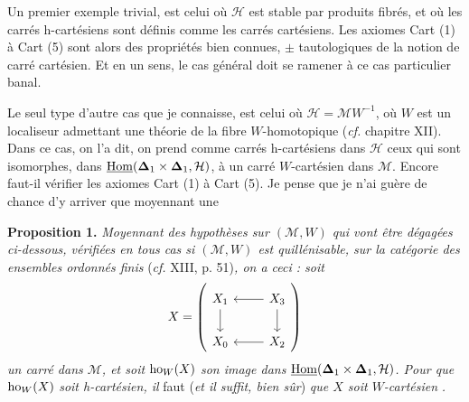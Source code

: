 Un premier exemple trivial, est celui où $\mathcal{H}$ est stable par produits fibrés, et où les carrés h-cartésiens sont définis comme les carrés cartésiens. Les axiomes Cart (1) à Cart (5) sont alors des propriétés bien connues, $\pm$ tautologiques de la notion de carré cartésien. Et
en un sens, le cas général doit se ramener à ce cas particulier banal.

Le seul type d'autre cas que je connaisse, est celui où $\mathcal{H} = \mathcal{M}W^{-1}$, où $W$ est un localiseur admettant une théorie de la fibre $W$-homotopique (\textit{cf.} chapitre XII). Dans ce cas, on l'a dit, on prend comme carrés h-cartésiens dans $\mathcal{H}$ ceux qui sont isomorphes, dans $\underline{\mathrm{Hom}}(\mathbf{\Delta}_1 \times \mathbf{\Delta}_1, \mathcal{H})$, à un carré $W$-cartésien dans $\mathcal{M}$. Encore faut-il vérifier les axiomes Cart (1) à Cart (5). Je pense que je n'ai guère de chance d'y arriver que moyennant une

\textbf{Proposition 1.} \textit{Moyennant des hypothèses sur $(\mathcal{M}, W)$ qui vont être dégagées ci-dessous, vérifiées en tous cas si $(\mathcal{M}, W)$ est quillénisable, sur la catégorie des ensembles ordonnés finis} (\textit{cf.} XIII, p. 51)\textit{, on a ceci : soit}
\[
X = \left(\begin{tikzcd}
X_1 \ar[d] & X_3 \ar[l] \ar[d] \\
X_0 & X_2 \ar[l]
\end{tikzcd}\right)
\]
\textit{un carré dans $\mathcal{M}$, et soit} $\mathrm{ho}_W(X)$ \textit{son image dans} $\underline{\mathrm{Hom}}(\mathbf{\Delta}_1 \times \mathbf{\Delta}_1, \mathcal{H})$\textit{. Pour que} $\mathrm{ho}_W(X)$ \textit{soit h-cartésien, il} faut (\textit{et il suffit, bien sûr}) \textit{que $X$ soit $W$-cartésien} \textit{.}

